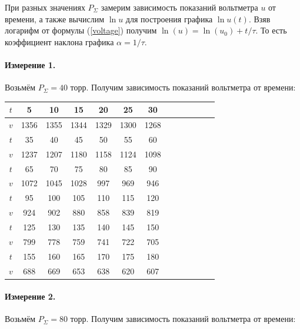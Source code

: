 \documentclass[a4paper,12pt]{article} %
\begin{document}
При разных значениях $P_\Sigma$ замерим зависимость показаний вольтметра $u$ от времени, а также вычислим $\ln{u}$ для построения графика $\ln{u} (t)$. Взяв логарифм от формулы (\ref{voltage}) получим $\ln(u) = \ln(u_0) + t/\tau$. То есть коэффициент наклона графика $\alpha = 1/\tau$.

\paragraph{Измерение 1.}
Возьмём $P_\Sigma = 40$ торр. Получим зависимость показаний вольтметра от времени:

\begin{center}
\begin{tabular}{|c||c|c|c|c|c|c|c|c|c|c|c|c|}
\hline
$t$ & 5 & 10 & 15 & 20 & 25 & 30 \\ 
\hline
$v$ & 1356 & 1355 & 1344 & 1329 & 1300 & 1268 \\ 
\hline
\hline
$t$ & 35 & 40 & 45 & 50 & 55 & 60 \\ 
\hline
$v$ & 1237 & 1207 & 1180 & 1158 & 1124 & 1098 \\ 
\hline
\hline
$t$ & 65 & 70 & 75 & 80 & 85 & 90 \\ 
\hline
$v$ & 1072 & 1045 & 1028 & 997 & 969 & 946 \\ 
\hline
\hline
$t$ & 95 & 100 & 105 & 110 & 115 & 120 \\ 
\hline
$v$ & 924 & 902 & 880 & 858 & 839 & 819 \\ 
\hline
\hline
$t$ & 125 & 130 & 135 & 140 & 145 & 150 \\ 
\hline
$v$ & 799 & 778 & 759 & 741 & 722 & 705 \\ 
\hline
\hline
$t$ & 155 & 160 & 165 & 170 & 175 & 180 \\ 
\hline
$v$ & 688 & 669 & 653 & 638 & 620 & 607 \\ 
\hline
\end{tabular}
\end{center}

\paragraph{Измерение 2.}
Возьмём $P_\Sigma = 80$ торр. Получим зависимость показаний вольтметра от времени:
\end{document}
